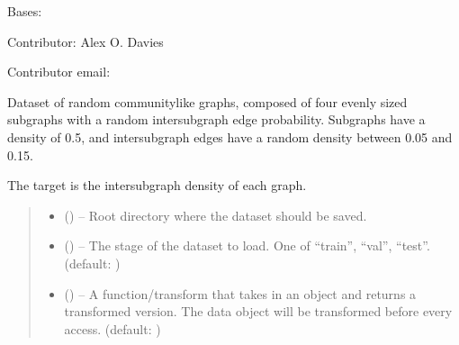 \documentclass[letterpaper,10pt,english]{sphinxhowto}
\begin{document}
\begin{fulllineitems}
\label{\detokenize{datasets/synthetic:datasets.synthetic.CommunityDataset}}
\pysigstartsignatures
{}
\pysigstopsignatures
\sphinxAtStartPar
Bases: 

\sphinxAtStartPar
Contributor: Alex O. Davies

\sphinxAtStartPar
Contributor email: 

\sphinxAtStartPar
Dataset of random community\sphinxhyphen{}like graphs, composed of four evenly sized subgraphs with a random inter\sphinxhyphen{}subgraph edge probability.
Subgraphs have a density of 0.5, and inter\sphinxhyphen{}subgraph edges have a random density between 0.05 and 0.15.

\sphinxAtStartPar
The target is the inter\sphinxhyphen{}subgraph density of each graph.
\begin{quote}\begin{description}
\begin{itemize}
\item {} 
\sphinxAtStartPar
{} () – Root directory where the dataset should be saved.

\item {} 
\sphinxAtStartPar
{} () – The stage of the dataset to load. One of “train”, “val”, “test”. (default: )

\item {} 
\sphinxAtStartPar
{} (\sphinxstyleliteralemphasis{\sphinxupquote{, }}) – A function/transform that takes in an  object and returns a transformed version. The data object will be transformed before every access. (default: )


\end{itemize}
\end{description}
\end{quote}
\end{fulllineitems}
\end{document}
